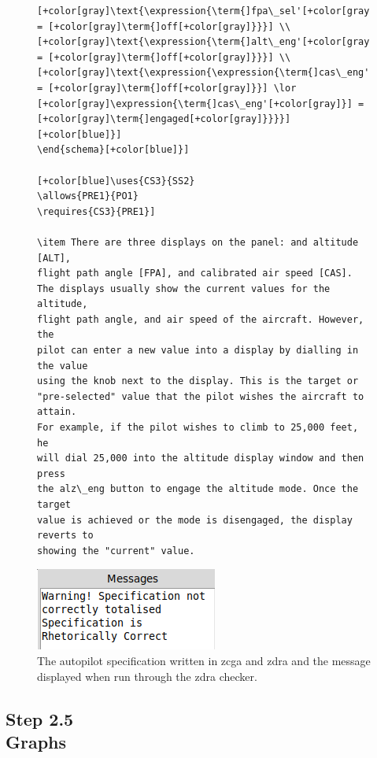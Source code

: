 \begin{figure}[H]
\begin{minipage}{0.45\textwidth}
\begin{tiny}
\begin{BVerbatim}[commandchars=+\[\]]
[+color[gray]\text{\expression{\term{]fpa\_sel'[+color[gray]}] = [+color[gray]\term{]off[+color[gray]}}}] \\
[+color[gray]\text{\expression{\term{]alt\_eng'[+color[gray]}] = [+color[gray]\term{]off[+color[gray]}}}] \\
[+color[gray]\text{\expression{\expression{\term{]cas\_eng'[+color[gray]}] = [+color[gray]\term{]off[+color[gray]}}] \lor
[+color[gray]\expression{\term{]cas\_eng'[+color[gray]}] = [+color[gray]\term{]engaged[+color[gray]}}}}][+color[blue]}]
\end{schema}[+color[blue]}]
     
[+color[blue]\uses{CS3}{SS2}
\allows{PRE1}{PO1}
\requires{CS3}{PRE1}]
     
\item There are three displays on the panel: and altitude [ALT],
flight path angle [FPA], and calibrated air speed [CAS]. 
The displays usually show the current values for the altitude, 
flight path angle, and air speed of the aircraft. However, the 
pilot can enter a new value into a display by dialling in the value 
using the knob next to the display. This is the target or 
"pre-selected" value that the pilot wishes the aircraft to attain. 
For example, if the pilot wishes to climb to 25,000 feet, he 
will dial 25,000 into the altitude display window and then press 
the alz\_eng button to engage the altitude mode. Once the target 
value is achieved or the mode is disengaged, the display reverts to 
showing the "current" value.
 \end{BVerbatim}
 \end{tiny}
 \includegraphics[scale=0.3]{Figures/fullexample/sfzdramessage.png}
 \caption{The autopilot specification written in \gls{zcga} and \gls{zdra} and the message displayed when run through the \gls{zdra} checker.\label{fig:sfzdrazcgaout}}
 \end{minipage}
 \end{figure}

\subsection{Step 2.5\\Graphs}

